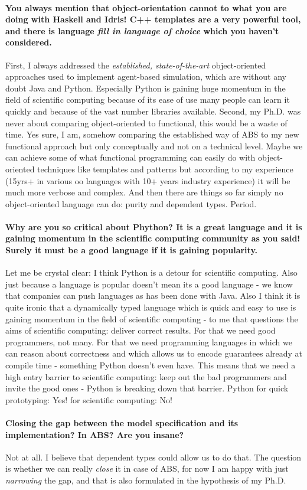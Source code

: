 \paragraph{You always mention that object-orientation cannot to what you are doing with Haskell and Idris! C++ templates are a very powerful tool, and there is language \textit{fill in language of choice} which you haven't considered.}
First, I always addressed the \textit{established, state-of-the-art} object-oriented approaches used to implement agent-based simulation, which are without any doubt Java and Python. Especially Python is gaining huge momentum in the field of scientific computing because of its ease of use many people can learn it quickly and because of the vast number libraries available. Second, my Ph.D. was never about comparing object-oriented to functional, this would be a waste of time. Yes sure, I am, somehow comparing the established way of ABS to my new functional approach but only conceptually and not on a technical level. Maybe we can achieve some of what functional programming can easily do with object-oriented techniques like templates and patterns but according to my experience (15yrs+ in various oo languages with 10+ years industry experience) it will be much more verbose and complex. And then there are things so far simply no object-oriented language can do: purity and dependent types. Period.

\paragraph{Why are you so critical about Phython? It is a great language and it is gaining momentum in the scientific computing community as you said! Surely it must be a good language if it is gaining popularity.}
Let me be crystal clear: I think Python is a detour for scientific computing. Also just because a language is popular doesn't mean its a good language - we know that companies can push languages as has been done with Java. Also I think it is quite ironic that a dynamically typed language which is quick and easy to use is gaining momentum in the field of scientific computing - to me that questions the aims of scientific computing: deliver correct results. For that we need good programmers, not many. For that we need programming languages in which we can reason about correctness and which allows us to encode guarantees already at compile time - something Python doesn't even have. This means that we need a high entry barrier to scientific computing: keep out the bad programmers and invite the good ones - Python is breaking down that barrier. Python for quick prototyping: Yes! for scientific computing: No!

\paragraph{Closing the gap between the model specification and its implementation? In ABS? Are you insane?}
Not at all. I believe that dependent types could allow us to do that. The question is whether we can really \textit{close} it in case of ABS, for now I am happy with just \textit{narrowing} the gap, and that is also formulated in the hypothesis of my Ph.D.